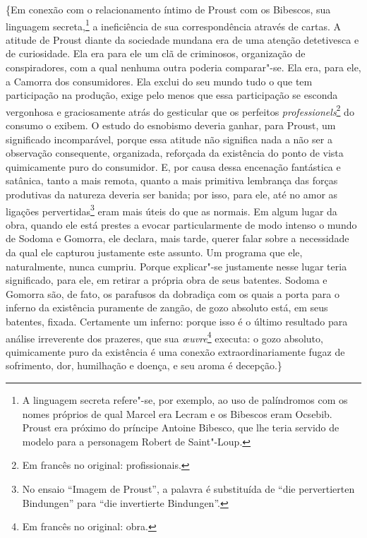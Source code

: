 \{Em conexão com o relacionamento íntimo de Proust com os Bibescos, sua
linguagem secreta,\footnote{A linguagem secreta refere"-se, por exemplo,
  ao uso de palíndromos com os nomes próprios de qual Marcel era Lecram
  e os Bibescos eram Ocsebib. Proust era próximo do príncipe Antoine
  Bibesco, que lhe teria servido de modelo para a personagem Robert de
  Saint"-Loup.} a ineficiência de sua correspondência através de cartas.
A atitude de Proust diante da sociedade mundana era de uma atenção
detetivesca e de curiosidade. Ela era para ele um clã de criminosos,
organização de conspiradores, com a qual nenhuma outra poderia
comparar"-se. Ela era, para ele, a Camorra dos consumidores. Ela exclui
do seu mundo tudo o que tem participação na produção, exige pelo menos
que essa participação se esconda vergonhosa e graciosamente atrás do
gesticular que os perfeitos \emph{professionels}\footnote{Em francês no original:
  profissionais. \versal{[N. T.]}} do consumo o exibem. O estudo do esnobismo deveria
ganhar, para Proust, um significado incomparável, porque essa atitude
não significa nada a não ser a observação consequente, organizada,
reforçada da existência do ponto de vista quimicamente puro do
consumidor. E, por causa dessa encenação fantástica e satânica, tanto a
mais remota, quanto a mais primitiva lembrança das forças produtivas da
natureza deveria ser banida; por isso, para ele, até no amor as ligações
pervertidas\footnote{No ensaio ``Imagem de Proust'', a palavra
  é substituída de ``die pervertierten Bindungen'' para ``die
  invertierte Bindungen''. \versal{[N. E.]}} eram mais úteis do que as normais. Em algum
lugar da obra, quando ele está prestes a evocar particularmente de modo
intenso o mundo de Sodoma e Gomorra, ele declara, mais tarde, querer
falar sobre a necessidade da qual ele capturou justamente este assunto.
Um programa que ele, naturalmente, nunca cumpriu. Porque explicar"-se
justamente nesse lugar teria significado, para ele, em retirar a própria
obra de seus batentes. Sodoma e Gomorra são, de fato, os parafusos da
dobradiça com os quais a porta para o inferno da existência puramente de
zangão, de gozo absoluto está, em seus batentes, fixada. Certamente um
inferno: porque isso é o último resultado para análise irreverente dos
prazeres, que sua \emph{œuvre}\footnote{Em francês no original:
  obra. \versal{[N. T.]}} executa: o gozo absoluto, quimicamente puro da existência é uma
conexão extraordinariamente fugaz de sofrimento, dor, humilhação e
doença, e seu aroma é decepção.\}


